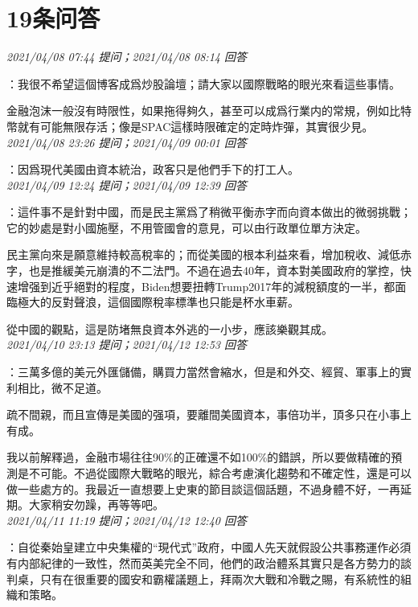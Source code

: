 \documentclass[twocolumn]{ctexart}
\begin{document}
\section{19条问答}

\textit{\hfill\noindent\small 2021/04/08 07:44 提问；2021/04/08 08:14 回答}

：我很不希望這個博客成爲炒股論壇；請大家以國際戰略的眼光來看這些事情。

金融泡沫一般沒有時限性，如果拖得夠久，甚至可以成爲行業内的常規，例如比特幣就有可能無限存活；像是SPAC這樣時限確定的定時炸彈，其實很少見。
\\

\textit{\hfill\noindent\small 2021/04/08 23:26 提问；2021/04/09 00:01 回答}

：因爲現代美國由資本統治，政客只是他們手下的打工人。
\\

\textit{\hfill\noindent\small 2021/04/09 12:24 提问；2021/04/09 12:39 回答}

：這件事不是針對中國，而是民主黨爲了稍微平衡赤字而向資本做出的微弱挑戰；它的妙處是對小國施壓，不用管國會的意見，可以由行政單位單方決定。

民主黨向來是願意維持較高稅率的；而從美國的根本利益來看，增加稅收、減低赤字，也是推緩美元崩潰的不二法門。不過在過去40年，資本對美國政府的掌控，快速增强到近乎絕對的程度，Biden想要扭轉Trump2017年的減稅額度的一半，都面臨極大的反對聲浪，這個國際稅率標準也只能是杯水車薪。

從中國的觀點，這是防堵無良資本外逃的一小步，應該樂觀其成。
\\

\textit{\hfill\noindent\small 2021/04/10 23:13 提问；2021/04/12 12:53 回答}

：三萬多億的美元外匯儲備，購買力當然會縮水，但是和外交、經貿、軍事上的實利相比，微不足道。

疏不間親，而且宣傳是美國的强項，要離間美國資本，事倍功半，頂多只在小事上有成。

我以前解釋過，金融市場往往90\%的正確還不如100\%的錯誤，所以要做精確的預測是不可能。不過從國際大戰略的眼光，綜合考慮演化趨勢和不確定性，還是可以做一些處方的。我最近一直想要上史東的節目談這個話題，不過身體不好，一再延期。大家稍安勿躁，再等等吧。
\\

\textit{\hfill\noindent\small 2021/04/11 11:19 提问；2021/04/12 12:40 回答}

：自從秦始皇建立中央集權的“現代式”政府，中國人先天就假設公共事務運作必須有内部紀律的一致性，然而英美完全不同，他們的政治體系其實只是各方勢力的談判桌，只有在很重要的國安和霸權議題上，拜兩次大戰和冷戰之賜，有系統性的組織和策略。
\end{document}
